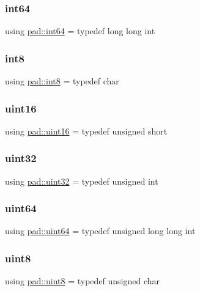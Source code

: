 \subsubsection{\texorpdfstring{int64}{int64}}
{\footnotesize\ttfamily using \mbox{\hyperlink{namespacepad_a91b3934f581b6b83d2618e069a120fdd}{pad\+::int64}} = typedef long long int}

\mbox{\label{namespacepad_a9f598447cac2137f85ac7bb9322fe6be}} 
\subsubsection{\texorpdfstring{int8}{int8}}
{\footnotesize\ttfamily using \mbox{\hyperlink{namespacepad_a9f598447cac2137f85ac7bb9322fe6be}{pad\+::int8}} = typedef char}

\mbox{\label{namespacepad_a03b9241a5f6a191da2faac64714e1038}} 
\subsubsection{\texorpdfstring{uint16}{uint16}}
{\footnotesize\ttfamily using \mbox{\hyperlink{namespacepad_a03b9241a5f6a191da2faac64714e1038}{pad\+::uint16}} = typedef unsigned short}

\mbox{\label{namespacepad_a4101021f78334c7c461eef5b0b2eaa6f}} 
\subsubsection{\texorpdfstring{uint32}{uint32}}
{\footnotesize\ttfamily using \mbox{\hyperlink{namespacepad_a4101021f78334c7c461eef5b0b2eaa6f}{pad\+::uint32}} = typedef unsigned int}

\mbox{\label{namespacepad_ae548145eb697683a147ccccabd88c77c}} 
\subsubsection{\texorpdfstring{uint64}{uint64}}
{\footnotesize\ttfamily using \mbox{\hyperlink{namespacepad_ae548145eb697683a147ccccabd88c77c}{pad\+::uint64}} = typedef unsigned long long int}

\mbox{\label{namespacepad_ac2d92bf238fe849ef0eab976bc6f6040}} 
\subsubsection{\texorpdfstring{uint8}{uint8}}
{\footnotesize\ttfamily using \mbox{\hyperlink{namespacepad_ac2d92bf238fe849ef0eab976bc6f6040}{pad\+::uint8}} = typedef unsigned char}

